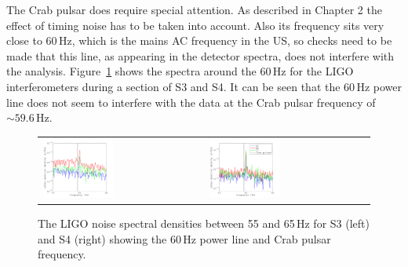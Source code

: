 The Crab pulsar does require special attention. As described in Chapter 2 the effect of timing
noise has to be taken into account. Also its \gw frequency sits very close to 60\,Hz, which is the
mains AC frequency in the US, so checks need to be made that this line, as appearing in the detector
spectra, does not interfere with the analysis. Figure~\ref{CrabSpectrum} shows the spectra around
the 60\,Hz for the LIGO interferometers during a section of S3 and S4. It can be seen that the
60\,Hz power line does not seem to interfere with the data at the Crab pulsar frequency of $\sim
59.6$\,Hz.
\begin{figure}[!htbp]
\begin{tabular}{l l}
\includegraphics[width=0.45\textwidth]{figs/S3CrabSpectrum} &
\includegraphics[width=0.45\textwidth]{figs/S4CrabSpectrum}
\end{tabular}\caption[The LIGO noise spectral densities between 55 and 65\,Hz for S3 and S4.]{The
LIGO noise spectral densities between 55 and 65\,Hz for S3 (left) and S4 (right) showing the 60\,Hz
power line and Crab pulsar frequency.}\label{CrabSpectrum}
\end{figure}

